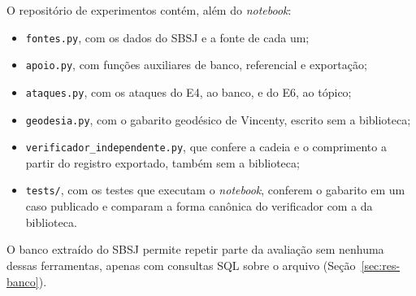 O repositório de experimentos contém, além do \textit{notebook}:
\begin{itemize}
    \item \texttt{fontes.py}, com os dados do SBSJ e a fonte de cada um;
    \item \texttt{apoio.py}, com funções auxiliares de banco, referencial e exportação;
    \item \texttt{ataques.py}, com os ataques do E4, ao banco, e do E6, ao tópico;
    \item \texttt{geodesia.py}, com o gabarito geodésico de Vincenty, escrito sem a biblioteca;
    \item \texttt{verificador\_independente.py}, que confere a cadeia e o comprimento a partir do registro exportado, também sem a biblioteca;
    \item \texttt{tests/}, com os testes que executam o \textit{notebook}, conferem o gabarito em um caso publicado e comparam a forma canônica do verificador com a da biblioteca.
\end{itemize}

O banco extraído do SBSJ \cite{aeroledger_dataset} permite repetir parte da avaliação sem nenhuma dessas ferramentas, apenas com consultas SQL sobre o arquivo (Seção~\ref{sec:res-banco}).

